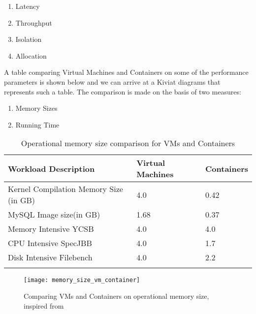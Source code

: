 \begin{enumerate}
    \item Latency
    \item Throughput
    \item Isolation
    \item Allocation
\end{enumerate}

A table comparing Virtual Machines and Containers on some of the performance parameters is shown below and we can arrive at a Kiviat diagrams that represents such a table.
The comparison is made on the basis of two measures:
\begin{enumerate}
    \item Memory Sizes
    \item Running Time
\end{enumerate}

\newpage
\begin{longtable}[t!]{|p{}|p{}|p{}|}
\hline\hline
Workload Description&Virtual Machines&Containers\\
\hline\hline
\hline
Kernel Compilation Memory Size (in GB)&4.0&0.42\\
\hline
MySQL Image size(in GB)&1.68&0.37\\
\hline
Memory Intensive YCSB&4.0&4.0\\
\hline
CPU Intensive SpecJBB&4.0&1.7\\
\hline
Disk Intensive Filebench&4.0&2.2\\
\hline
\hline\hline
\label{tab:tab4}
\caption{Operational memory size comparison for VMs and Containers \cite{sharma16}}
\end{longtable}




\begin{figure}[h!]
    \centering
    \texttt{[image: memory\_size\_vm\_container]}
    \label{fig:12}
    \caption{Comparing VMs and Containers on operational memory size, inspired from \protect\cite{mach17}}
\end{figure}

